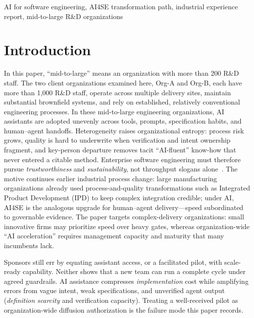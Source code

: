\documentclass[10pt,conference]{IEEEtran}
\begin{document}
\begin{IEEEkeywords}
AI for software engineering, AI4SE transformation path, industrial experience report, mid-to-large R\&D organizations
\end{IEEEkeywords}

\section{Introduction}
\label{sec:intro}

In this paper, ``mid-to-large'' means an organization with more than 200 R\&D
staff. The two client organizations examined here, Org-A and Org-B, each have
more than 1,000 R\&D staff, operate
across multiple delivery sites, maintain substantial brownfield systems, and
rely on established, relatively conventional engineering processes. In these
mid-to-large engineering organizations, AI assistants are adopted unevenly
across tools, prompts, specification habits, and human--agent handoffs.
Heterogeneity raises organizational entropy: process risk grows, quality is
hard to underwrite when verification and intent ownership fragment, and
key-person departure removes tacit ``AI-fluent'' know-how that never entered a
citable method.
Enterprise software engineering must therefore pursue \emph{trustworthiness}
and \emph{sustainability}, not throughput slogans alone~\cite{Forsgren2021SPACE}.
The motive continues earlier industrial process change: large manufacturing
organizations already used process-and-quality transformations such as
Integrated Product Development (IPD) to keep complex integration credible;
under AI, AI4SE is the analogous upgrade for human--agent delivery---speed
subordinated to governable evidence.
The paper targets complex-delivery organizations: small innovative firms may
prioritize speed over heavy gates, whereas organization-wide ``AI acceleration''
requires management capacity and maturity that many incumbents lack.

Sponsors still err by equating assistant access, or a facilitated pilot, with
scale-ready capability.
Neither shows that a new team can run a complete cycle under agreed
guardrails.
AI assistance compresses \emph{implementation} cost while amplifying errors
from vague intent, weak specifications, and unverified agent output
(\emph{definition scarcity} and verification capacity).
Treating a well-received pilot as organization-wide diffusion authorization is
the failure mode this paper records.
\end{document}
